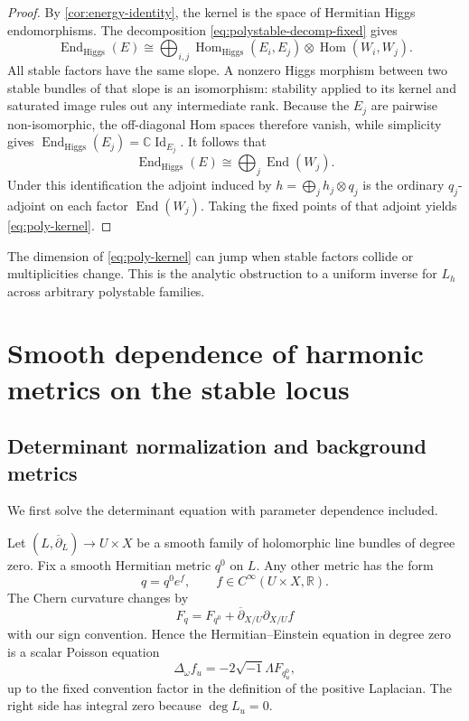 \documentclass[11pt,reqno]{amsart}
\theoremstyle{definition}
\theoremstyle{remark}
\newcommand{\C}{\mathbb C}
\newcommand{\R}{\mathbb R}
\newcommand{\End}{\operatorname{End}}
\newcommand{\Hom}{\operatorname{Hom}}
\newcommand{\Id}{\operatorname{Id}}
\newcommand{\ddbar}{\overline\partial}
\begin{document}
\begin{proof}
By \cref{cor:energy-identity}, the kernel is the space of Hermitian
Higgs endomorphisms.  The decomposition \eqref{eq:polystable-decomp-fixed}
gives
\[
 \End_{\mathrm{Higgs}}(E)
 \cong
 \bigoplus_{i,j}
 \Hom_{\mathrm{Higgs}}(E_i,E_j)
 \otimes\Hom(W_i,W_j).
\]
All stable factors have the same slope.  A nonzero Higgs morphism
between two stable bundles of that slope is an isomorphism: stability
applied to its kernel and saturated image rules out any intermediate
rank.  Because the $E_j$ are pairwise non-isomorphic, the off-diagonal
Hom spaces therefore vanish, while simplicity gives
$\End_{\mathrm{Higgs}}(E_j)=\C\Id_{E_j}$.  It follows that
\[
  \End_{\mathrm{Higgs}}(E)
  \cong\bigoplus_j\End(W_j).
\]
Under this identification the adjoint induced by
$h=\bigoplus_jh_j\otimes q_j$ is the ordinary $q_j$-adjoint on each
factor $\End(W_j)$.  Taking the fixed points of that adjoint yields
\eqref{eq:poly-kernel}.
\end{proof}

The dimension of \eqref{eq:poly-kernel} can jump when stable factors collide or multiplicities change.  This is the analytic obstruction to a uniform inverse for $L_h$ across arbitrary polystable families.

\section{Smooth dependence of harmonic metrics on the stable locus}\label{sec:smooth-metrics}

\subsection{Determinant normalization and background metrics}

We first solve the determinant equation with parameter dependence included.

Let $(L,\ddbar_L)\to U\times X$ be a smooth family of holomorphic line bundles of degree zero.  Fix a smooth Hermitian metric $q^0$ on $L$.  Any other metric has the form
\[
  q=q^0e^f,
  \qquad f\in C^\infty(U\times X,\R).
\]
The Chern curvature changes by
\[
  F_q=F_{q^0}+\ddbar_{X/U}\partial_{X/U}f
\]
with our sign convention.  Hence the Hermitian--Einstein equation in degree zero is a scalar Poisson equation
\begin{equation}\label{eq:det-poisson}
  \Delta_\omega f_u
  =-2\sqrt{-1}\Lambda F_{q^0_u},
\end{equation}
up to the fixed convention factor in the definition of the positive Laplacian.  The right side has integral zero because $\deg L_u=0$.
\end{document}
